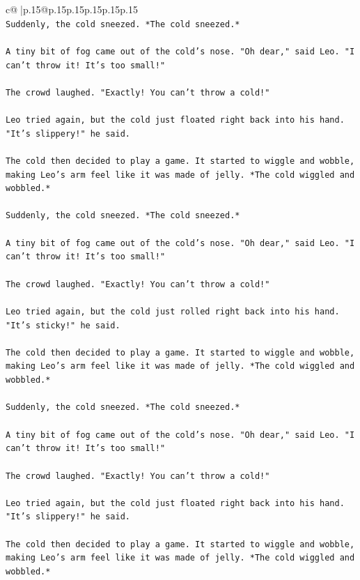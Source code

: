 \documentclass{article}
\begin{document}
{\begin{supertabular}{c@{$\;$}|p{.15\linewidth}@{}p{.15\linewidth}p{.15\linewidth}p{.15\linewidth}p{.15\linewidth}p{.15\linewidth}}
{{{\\ 
\texttt{Suddenly, the cold sneezed. *The cold sneezed.*} \\
\\ 
\texttt{A tiny bit of fog came out of the cold's nose. "Oh dear," said Leo. "I can't throw it! It's too small!"} \\
\\ 
\texttt{The crowd laughed. "Exactly! You can't throw a cold!"} \\
\\ 
\texttt{Leo tried again, but the cold just floated right back into his hand. "It's slippery!" he said.} \\
\\ 
\texttt{The cold then decided to play a game. It started to wiggle and wobble, making Leo's arm feel like it was made of jelly. *The cold wiggled and wobbled.*} \\
\\ 
\texttt{Suddenly, the cold sneezed. *The cold sneezed.*} \\
\\ 
\texttt{A tiny bit of fog came out of the cold's nose. "Oh dear," said Leo. "I can't throw it! It's too small!"} \\
\\ 
\texttt{The crowd laughed. "Exactly! You can't throw a cold!"} \\
\\ 
\texttt{Leo tried again, but the cold just rolled right back into his hand. "It's sticky!" he said.} \\
\\ 
\texttt{The cold then decided to play a game. It started to wiggle and wobble, making Leo's arm feel like it was made of jelly. *The cold wiggled and wobbled.*} \\
\\ 
\texttt{Suddenly, the cold sneezed. *The cold sneezed.*} \\
\\ 
\texttt{A tiny bit of fog came out of the cold's nose. "Oh dear," said Leo. "I can't throw it! It's too small!"} \\
\\ 
\texttt{The crowd laughed. "Exactly! You can't throw a cold!"} \\
\\ 
\texttt{Leo tried again, but the cold just floated right back into his hand. "It's slippery!" he said.} \\
\\ 
\texttt{The cold then decided to play a game. It started to wiggle and wobble, making Leo's arm feel like it was made of jelly. *The cold wiggled and wobbled.*} \\
}}}
\end{supertabular}}
\end{document}
